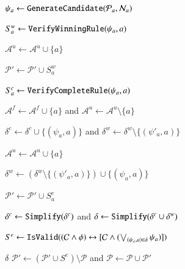 \documentclass[review]{elsarticle}
\newcommand{\set}[1]{\{ #1 \}}
\newcommand{\true}{\top}
\newcommand{\false}{\bot}
\newcommand{\positiveSet}{\mathcal{P}}
\newcommand{\negativeSet}{\mathcal{N}}
\newcommand{\act}{\mathcal{A}}
\newcommand{\constraint}{\mathcal{C}}
\newcommand{\assign}{\leftarrow}
\begin{document}
\begin{algorithm}[htbp]
{{			$\psi_a \assign {\tt GenerateCandidate}(\positiveSet_a, \negativeSet_a)$
						
			
			$S^w_a \assign {\tt VerifyWinningRule}(\psi_a, a)$
			
			{
				$\act^u \assign \act^u \cup \set{a}$
				
				$\positiveSet' \assign \positiveSet' \cup S^w_a$
				
				
			\vspace*{-1mm}}
			{
				$S^c_a \assign {\tt VerifyCompleteRule}(\psi_a, a)$
				
				{					
					$\act^f \assign \act^f \cup \set{a}$ and $\act^u \assign \act^u \setminus \set{a}$
					
					$\delta^c \assign \delta^c \cup \set{(\psi_a, a)}$ and $\delta^w \assign \delta^w \setminus \set{(\psi'_a, a)}$ 
					\vspace*{-1mm}}
				\Else
				{
					$\act^u \assign \act^u \cup \set{a}$
					
					$\delta^w \assign (\delta^w \setminus \set{(\psi'_a, a)}) \cup \set{(\psi_a, a)}$ 
					
					$\positiveSet' \assign \positiveSet' \cup S^c_a$
				
				\vspace*{-1mm}}				
			\vspace*{-1mm}}
		\vspace*{-1mm}}
				
		$\delta^c \assign  {\tt Simplify}(\delta^c)$ and $\delta \assign {\tt Simplify}(\delta^c \cup \delta^w)$
		
		$S^e \assign {\tt IsValid}((\constraint \land \phi) \leftrightarrow [\constraint \land (\bigvee_{(\psi_a, a) \in \delta} \psi_a)])$		
		
		{	
			\Return $\delta$
		}
		\lElse
		{
			$\positiveSet' \assign (\positiveSet' \cup S^e) \setminus \positiveSet$ and	$\positiveSet \assign \positiveSet \cup \positiveSet'$
		}
	}
\end{algorithm}
\end{document}
